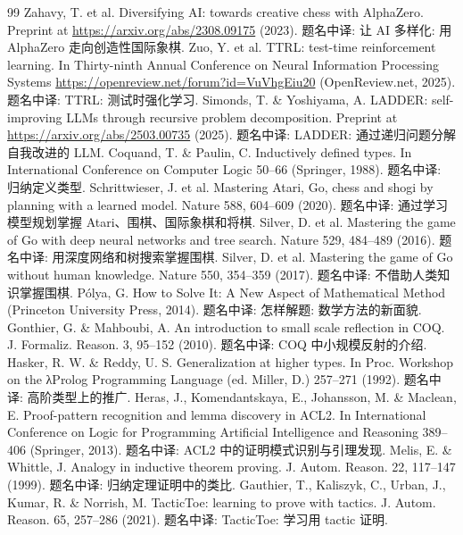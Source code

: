\begin{thebibliography}{99}
 Zahavy, T. et al. Diversifying AI: towards creative chess with AlphaZero. Preprint at \url{https://arxiv.org/abs/2308.09175} (2023). 题名中译: 让 AI 多样化: 用 AlphaZero 走向创造性国际象棋.
 Zuo, Y. et al. TTRL: test-time reinforcement learning. In Thirty-ninth Annual Conference on Neural Information Processing Systems \url{https://openreview.net/forum?id=VuVhgEiu20} (OpenReview.net, 2025). 题名中译: TTRL: 测试时强化学习.
 Simonds, T. \& Yoshiyama, A. LADDER: self-improving LLMs through recursive problem decomposition. Preprint at \url{https://arxiv.org/abs/2503.00735} (2025). 题名中译: LADDER: 通过递归问题分解自我改进的 LLM.
 Coquand, T. \& Paulin, C. Inductively defined types. In International Conference on Computer Logic 50--66 (Springer, 1988). 题名中译: 归纳定义类型.
 Schrittwieser, J. et al. Mastering Atari, Go, chess and shogi by planning with a learned model. Nature 588, 604--609 (2020). 题名中译: 通过学习模型规划掌握 Atari、围棋、国际象棋和将棋.
 Silver, D. et al. Mastering the game of Go with deep neural networks and tree search. Nature 529, 484--489 (2016). 题名中译: 用深度网络和树搜索掌握围棋.
 Silver, D. et al. Mastering the game of Go without human knowledge. Nature 550, 354--359 (2017). 题名中译: 不借助人类知识掌握围棋.
 Pólya, G. How to Solve It: A New Aspect of Mathematical Method (Princeton University Press, 2014). 题名中译: 怎样解题: 数学方法的新面貌.
 Gonthier, G. \& Mahboubi, A. An introduction to small scale reflection in COQ. J. Formaliz. Reason. 3, 95--152 (2010). 题名中译: COQ 中小规模反射的介绍.
 Hasker, R. W. \& Reddy, U. S. Generalization at higher types. In Proc. Workshop on the λProlog Programming Language (ed. Miller, D.) 257--271 (1992). 题名中译: 高阶类型上的推广.
 Heras, J., Komendantskaya, E., Johansson, M. \& Maclean, E. Proof-pattern recognition and lemma discovery in ACL2. In International Conference on Logic for Programming Artificial Intelligence and Reasoning 389--406 (Springer, 2013). 题名中译: ACL2 中的证明模式识别与引理发现.
 Melis, E. \& Whittle, J. Analogy in inductive theorem proving. J. Autom. Reason. 22, 117--147 (1999). 题名中译: 归纳定理证明中的类比.
 Gauthier, T., Kaliszyk, C., Urban, J., Kumar, R. \& Norrish, M. TacticToe: learning to prove with tactics. J. Autom. Reason. 65, 257--286 (2021). 题名中译: TacticToe: 学习用 tactic 证明.
\end{thebibliography}
